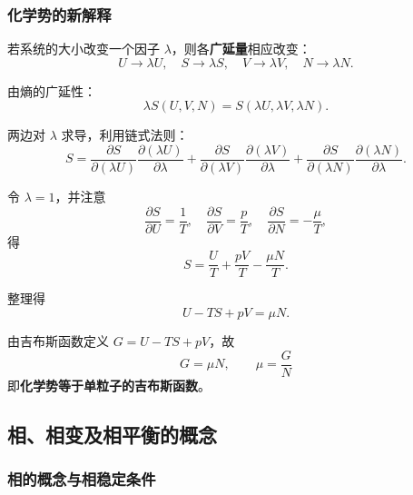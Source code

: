 \documentclass[UTF8]{ctexart}
\theoremstyle{definition}
\begin{document}
\subsubsection*{化学势的新解释}

若系统的大小改变一个因子 $\lambda$，则各\textbf{广延量}相应改变：
\begin{equation}
U\to\lambda U,\quad S\to\lambda S,\quad V\to\lambda V,\quad N\to\lambda N.
\end{equation}

由熵的广延性：
\begin{equation}
\lambda S(U,V,N) = S(\lambda U,\lambda V,\lambda N).
\end{equation}

两边对 $\lambda$ 求导，利用链式法则：
\begin{equation}
S = \frac{\partial S}{\partial(\lambda U)}\frac{\partial(\lambda U)}{\partial\lambda}
+ \frac{\partial S}{\partial(\lambda V)}\frac{\partial(\lambda V)}{\partial\lambda}
+ \frac{\partial S}{\partial(\lambda N)}\frac{\partial(\lambda N)}{\partial\lambda}.
\end{equation}

令 $\lambda=1$，并注意
\begin{equation}
\frac{\partial S}{\partial U} = \frac{1}{T},\quad
\frac{\partial S}{\partial V} = \frac{p}{T},\quad
\frac{\partial S}{\partial N} = -\frac{\mu}{T},
\end{equation}
得
\begin{equation}
S = \frac{U}{T} + \frac{pV}{T} - \frac{\mu N}{T}.
\end{equation}

整理得
\begin{equation}
U - TS + pV = \mu N.
\end{equation}

由吉布斯函数定义 $G = U - TS + pV$，故
\begin{equation}
\boxed{G = \mu N,\qquad \mu = \frac{G}{N}}
\end{equation}
即\textbf{化学势等于单粒子的吉布斯函数}。


\subsection{相、相变及相平衡的概念}

\subsubsection*{相的概念与相稳定条件}
\end{document}
